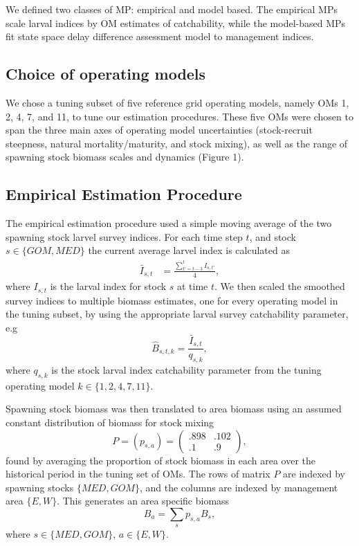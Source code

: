\documentclass[]{article}
\begin{document}
We defined two classes of MP: empirical and model based. The empirical MPs
scale larval indices by OM estimates of catchability, while the
model-based MPs fit state space delay difference assessment model
to management indices.

\hypertarget{choice-of-operating-models}{%
\subsection{Choice of operating models}\label{choice-of-operating-models}}

We chose a tuning subset of five reference grid operating models,
namely OMs 1, 2, 4, 7, and 11, to tune our estimation procedures.
These five OMs were chosen to span the three main axes
of operating model uncertainties (stock-recruit steepness, natural
mortality/maturity, and stock mixing), as well as the range of spawning
stock biomass scales and dynamics (Figure 1).

\hypertarget{empirical-estimation-procedure}{%
\subsection{Empirical Estimation Procedure}\label{empirical-estimation-procedure}}

The empirical estimation procedure used a simple moving average of
the two spawning stock larvel survey indices. For each time step \(t\),
and stock \(s \in \{GOM, MED\}\) the current average larvel index is
calculated as
\begin{align}
\bar{I}_{s,t} & = \frac{\sum_{t'= t-3}^{t} I_{s,t'}}{4}, 
\end{align}
where \(I_{s,t}\) is the larval index for stock \(s\) at time \(t\). We then
scaled the smoothed survey indices to multiple biomass estimates, one
for every operating model in the tuning subset, by using the appropriate
larval survey catchability parameter, e.g
\begin{equation}
\hat{B}_{s,t,k} = \frac{\bar{I}_{s,t}}{q_{s,k}},
\end{equation}
where \(q_{s,k}\) is the stock larval index catchability parameter from
the tuning operating model \(k \in \{1,2,4,7,11\}\).

Spawning stock biomass was then translated to area biomass using an
assumed constant distribution of biomass for stock mixing
\begin{equation}
P = (p_{s,a}) =  \left( \begin{array}{cc}
                .898 & .102 \\
                .1 & .9
            \end{array}
    \right),                    
\end{equation}
found by averaging the proportion of stock biomass in each area
over the historical period in the tuning set of OMs. The rows
of matrix \(P\) are indexed by spawning stocks \(\{MED, GOM\}\), and the
columns are indexed by management area \(\{ E, W\}\). This generates
an area specific biomass
\begin{equation}
B_a = \sum_{s} p_{s,a} B_s,
\end{equation}
where \(s \in \{MED, GOM\}\), \(a \in \{E, W\}\).
\end{document}
